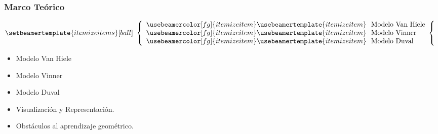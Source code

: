 \documentclass{beamer}
\newcommand{\myitem}{
    {\leavevmode \usebeamercolor[fg]{itemize item} \usebeamertemplate{itemize item}~~}
}
\begin{document}
    \frame
    {
        \frametitle{Marco Teórico}
        \begin{equation*}
        \setbeamertemplate{itemize items}[ball]
        \begin{array}{l}
        \left\{
        \begin{array}{l}
            \myitem \mbox{Modelo Van Hiele}\\
            \myitem \mbox{Modelo Vinner}\\
            \myitem \mbox{Modelo Duval}
        \end{array}   
            \right\{        
        \end{array}
        \end{equation*}

        \begin{itemize}
         \item Modelo Van Hiele
         \item Modelo Vinner
         \item Modelo Duval
         \item Visualización y Representación.
         \item Obstáculos al aprendizaje geométrico.
                \end{itemize}
    }
\end{document}
